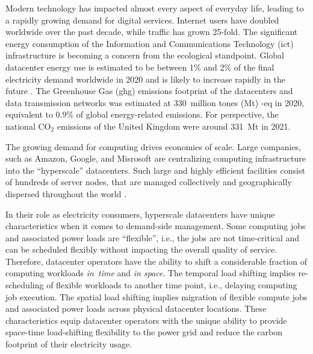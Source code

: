 %



Modern technology has impacted almost every aspect of everyday life, leading to a rapidly growing demand for digital services. Internet users have doubled worldwide over the past decade, while traffic has grown 25-fold. \cite{ieaDataCentresData2023}
The significant energy consumption of the Information and Communications Technology (\gls{ict}) infrastructure is becoming a concern from the ecological standpoint.
Global datacenter energy use is estimated to be between 1\% and 2\% of the final electricity demand worldwide in 2020 \cite{davidmyttonHowMuchEnergy2020, masanetRecalibratingGlobalData2020} and is likely to increase rapidly in the future \cite{andraeGlobalElectricityUsage2015}. 
The Greenhouse Gas (\gls{ghg}) emissions footprint of the datacenters and data transmission networks was estimated at 330~million tones (Mt) \co-eq in 2020, equivalent to 0.9\% of global energy-related emissions. \cite{ieaDataCentresData2023, malmodinICTSectorElectricity2023} 
For perspective, the national CO$_2$ emissions of the United Kingdom were around 331~Mt in 2021. \cite{UKnationalstats} 


The growing demand for computing drives economies of scale. Large companies, such as Amazon, Google, and Misrosoft are centralizing computing infrastructure into the \enquote{hyperscale} datacenters. 
Such large and highly efficient facilities consist of hundreds of server nodes, that are managed collectively and geographically dispersed throughout the world \cite{ThereAre500}. 

In their role as electricity consumers, hyperscale datacenters have unique characteristics when it comes to demand-side management. 
Some computing jobs and associated power loads are \enquote{flexible}, i.e., the jobs are not time-critical and can be scheduled flexibly without impacting the overall quality of service.
Therefore, datacenter operators have the ability to shift a considerable fraction of computing workloads \textit{in~time} and \textit{in space}. \cite{radovanovicIEEE2023} 
The temporal load shifting implies re-scheduling of flexible workloads to another time point, i.e., delaying computing job execution. 
The spatial load shifting implies migration of flexible compute jobs and associated power loads across physical datacenter locations. 
These characteristics equip datacenter operators with the unique ability to provide space-time load-shifting flexibility to the power grid \cite{zhangRemuneratingSpaceTime2022} and reduce the carbon footprint of their electricity usage. \cite{radovanovicIEEE2023, douCarbonAwareElectricityCost2017}


